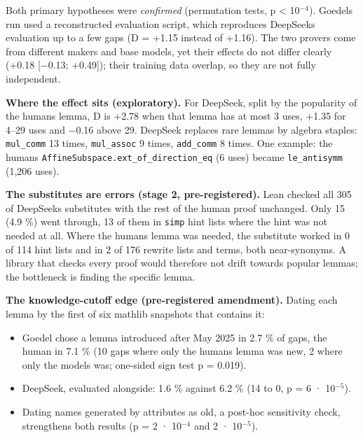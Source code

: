 \documentclass[11pt,a4paper]{article}
\providecommand{\tightlist}{\setlength{\itemsep}{0pt}\setlength{\parskip}{0pt}}
\begin{document}
Both primary hypotheses were \emph{confirmed} (permutation tests, p \textless{} 10\(^{-4}\)). Goedel\textquotesingle s run used a reconstructed evaluation script, which reproduces DeepSeek\textquotesingle s evaluation up to a few gaps (D = +1.15 instead of +1.16). The two provers come from different makers and base models, yet their effects do not differ clearly (+0.18 {[}−0.13; +0.49{]}); their training data overlap, so they are not fully independent.

\textbf{Where the effect sits (exploratory).} For DeepSeek, split by the popularity of the human\textquotesingle s lemma, D is +2.78 when that lemma has at most 3 uses, +1.35 for 4--29 uses and −0.16 above 29. DeepSeek replaces rare lemmas by algebra staples: \texttt{mul\_\allowbreak{}comm} 13 times, \texttt{mul\_\allowbreak{}assoc} 9 times, \texttt{add\_\allowbreak{}comm} 8 times. One example: the human\textquotesingle s \texttt{AffineSubspace.ext\_\allowbreak{}of\_\allowbreak{}direction\_\allowbreak{}eq} (6 uses) became \texttt{le\_\allowbreak{}antisymm} (1,206 uses).

\textbf{The substitutes are errors (stage 2, pre-registered).} Lean checked all 305 of DeepSeek\textquotesingle s substitutes with the rest of the human proof unchanged. Only 15 (4.9 \%) went through, 13 of them in \texttt{simp} hint lists where the hint was not needed at all. Where the human\textquotesingle s lemma was needed, the substitute worked in 0 of 114 hint lists and in 2 of 176 rewrite lists and terms, both near-synonyms. A library that checks every proof would therefore not drift towards popular lemmas; the bottleneck is finding the specific lemma.

\textbf{The knowledge-cutoff edge (pre-registered amendment).} Dating each lemma by the first of six mathlib snapshots that contains it:

\begin{itemize}
\tightlist
\item
  Goedel chose a lemma introduced after May 2025 in 2.7 \% of gaps, the human in 7.1 \% (10 gaps where only the human\textquotesingle s lemma was new, 2 where only the model\textquotesingle s was; one-sided sign test p = 0.019).
\item
  DeepSeek, evaluated alongside: 1.6 \% against 6.2 \% (14 to 0, p = 6 · 10\(^{-5}\)).
\item
  Dating names generated by attributes as old, a post-hoc sensitivity check, strengthens both results (p = 2 · 10\(^{-4}\) and 2 · 10\(^{-5}\)).
\end{itemize}
\end{document}

